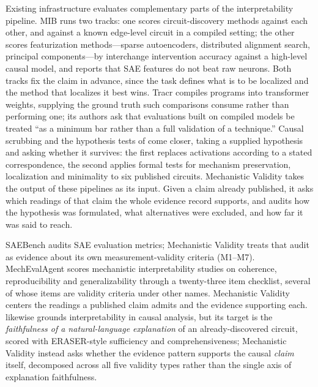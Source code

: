 \documentclass{article}
\begin{document}
Existing infrastructure evaluates complementary parts of the interpretability pipeline. MIB \citep{mueller2025mib} runs two tracks: one scores circuit-discovery methods against each other, and against a known edge-level circuit in a compiled setting; the other scores featurization methods---sparse autoencoders, distributed alignment search, principal components---by interchange intervention accuracy against a high-level causal model, and reports that SAE features do not beat raw neurons. Both tracks fix the claim in advance, since the task defines what is to be localized and the method that localizes it best wins. Tracr \citep{lindner2023interp} compiles programs into transformer weights, supplying the ground truth such comparisons consume rather than performing one; its authors ask that evaluations built on compiled models be treated ``as a minimum bar rather than a full validation of a technique.'' Causal scrubbing \citep{chan2022causal} and the hypothesis tests of \citet{shi2024hypothesis} come closer, taking a supplied hypothesis and asking whether it survives: the first replaces activations according to a stated correspondence, the second applies formal tests for mechanism preservation, localization and minimality to six published circuits. Mechanistic Validity takes the output of these pipelines as its input. Given a claim already published, it asks which readings of that claim the whole evidence record supports, and audits how the hypothesis was formulated, what alternatives were excluded, and how far it was said to reach.

SAEBench \citep{karvonen2025saebench} audits SAE evaluation metrics; Mechanistic Validity treats that audit as evidence about its own measurement-validity criteria (M1--M7). MechEvalAgent \citep{bai2026mecheval} scores mechanistic interpretability studies on coherence, reproducibility and generalizability through a twenty-three item checklist, several of whose items are validity criteria under other names. Mechanistic Validity centers the readings a published claim admits and the evidence supporting each. \citet{mahale2026causally} likewise grounds interpretability in causal analysis, but its target is the \emph{faithfulness of a natural-language explanation} of an already-discovered circuit, scored with ERASER-style sufficiency and comprehensiveness; Mechanistic Validity instead asks whether the evidence pattern supports the causal \emph{claim} itself, decomposed across all five validity types rather than the single axis of explanation faithfulness.
\end{document}

